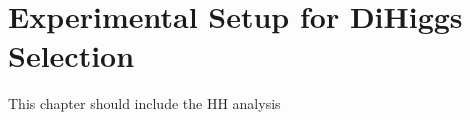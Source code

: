 \newpage
\chapter{Experimental Setup for DiHiggs Selection}
\label{Ana}

This chapter should include the HH analysis 